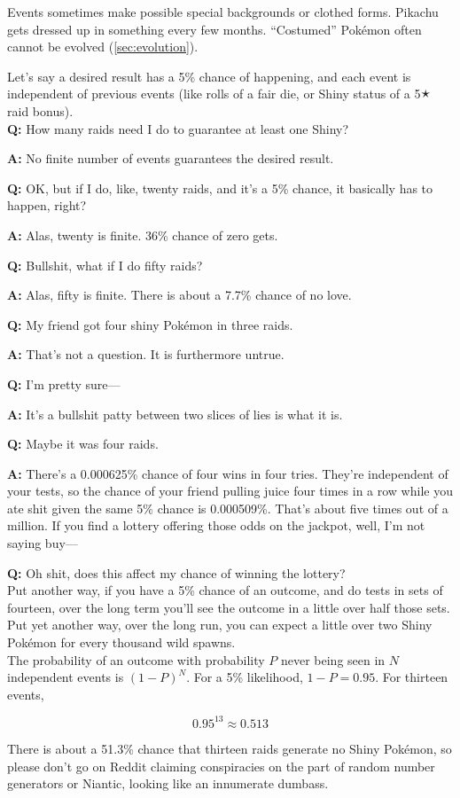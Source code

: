 Events sometimes make possible special backgrounds or clothed forms.
Pikachu gets dressed up in something every few months.
``Costumed'' Pokémon often cannot be evolved (\autoref{sec:evolution}).
\clearpage
\begin{tipbox}[title=An aside regarding independent events,title style={color=Green!50!black}]
Let's say a desired result has a 5\% chance of happening, and each event is independent of previous events (like rolls of a fair die, or Shiny status of a 5🟉 raid bonus).\\

\textbf{Q:} How many raids need I do to guarantee at least one Shiny?

\textbf{A:} No finite number of events guarantees the desired result.

\textbf{Q:} OK, but if I do, like, twenty raids, and it's a 5\% chance, it basically has to happen, right?

\textbf{A:} Alas, twenty is finite. 36\% chance of zero gets.

\textbf{Q:} Bullshit, what if I do fifty raids?

\textbf{A:} Alas, fifty is finite. There is about a 7.7\% chance of no love.

\textbf{Q:} My friend got four shiny Pokémon in three raids.

\textbf{A:} That's not a question. It is furthermore untrue.

\textbf{Q:} I'm pretty sure---

\textbf{A:} It's a bullshit patty between two slices of lies is what it is.

\textbf{Q:} Maybe it was four raids.

\textbf{A:} There's a 0.000625\% chance of four wins in four tries. They're independent of your tests,
             so the chance of your friend pulling juice four times in a row while you ate shit given
             the same 5\% chance is 0.000509\%. That's about five times out of a million.
             If you find a lottery offering those odds on the jackpot, well, I'm not saying buy---

\textbf{Q:} Oh shit, does this affect my chance of winning the lottery?\\

Put another way, if you have a 5\% chance of an outcome, and do tests in sets of fourteen,
 over the long term you'll see the outcome in a little over half those sets.
Put yet another way, over the long run, you can expect a little over two Shiny
 Pokémon for every thousand wild spawns.\\

The probability of an outcome with probability $P$ never being seen in $N$ independent
  events is ${(1 - P)}^N$. For a 5\% likelihood, $1 - P = 0.95$. For thirteen events,

  \[ 0.95^{13} ≈ 0.513 \]

There is about a 51.3\% chance that thirteen raids generate no Shiny Pokémon,
  so please don't go on Reddit claiming conspiracies on the part of
  random number generators or Niantic, looking like an innumerate dumbass.
\end{tipbox}
\pagecolor{black}

